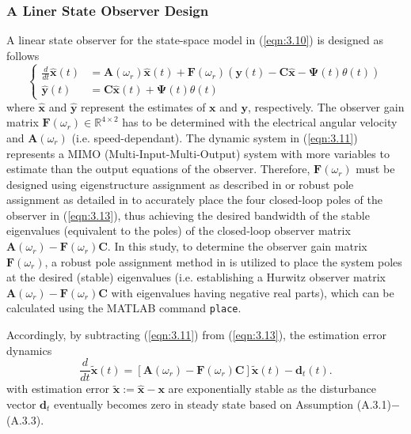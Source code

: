 \subsubsection{A Liner State Observer Design}
A linear state observer for the state-space model in (\ref{eqn:3.10}) is designed as follows
\begin{equation}\label{eqn:3.13}
\left\{
\begin{aligned}
    \frac{d}{dt} \hat{\mathbf{x}}(t) &= \mathbf{A}(\omega_r) \hat{\mathbf{x}}(t) + \mathbf{F}(\omega_r) \left( \mathbf{y}(t) - \mathbf{C} \hat{\mathbf{x}} - \mathbf{\Psi}(t) \theta(t) \right) \\
    \hat{\mathbf{y}}(t) &= \mathbf{C} \hat{\mathbf{x}}(t) + \mathbf{\Psi}(t) \theta(t)
\end{aligned}
\right.
\end{equation}
where \(\mathbf{\hat{x}}\) and \(\mathbf{\hat{y}}\) represent the estimates of \(\mathbf{x}\) and \(\mathbf{y}\), respectively. The observer gain matrix \(\mathbf{F}(\omega_r) \in \mathbb{R}^{4 \times 2}\) has to be determined with the electrical angular velocity and $\mathbf{A}(\omega_r)$ (i.e. speed-dependant). The dynamic system in (\ref{eqn:3.11}) represents a MIMO (Multi-Input-Multi-Output) system with more variables to estimate than the output equations of the observer. Therefore, \(\mathbf{F}(\omega_r)\) must be designed using eigenstructure assignment as described in \cite{c3.2_2} or robust pole assignment as detailed in \cite{c3.2_3} to accurately place the four closed-loop poles of the observer in (\ref{eqn:3.13}), thus achieving the desired bandwidth of the stable eigenvalues (equivalent to the poles) of the closed-loop observer matrix \(\mathbf{A}(\omega_r) - \mathbf{F}(\omega_r)\mathbf{C}\). In this study, to determine the observer gain matrix \( \mathbf{F}(\omega_r) \), a robust pole assignment method in \cite{c3.2_3} is utilized to place the system poles at the desired (stable) eigenvalues (i.e. establishing a Hurwitz observer matrix \(\mathbf{A}(\omega_r) - \mathbf{F}(\omega_r)\mathbf{C}\) with eigenvalues having negative real parts), which can be calculated using the MATLAB command \texttt{place}. 

Accordingly, by subtracting (\ref{eqn:3.11}) from (\ref{eqn:3.13}), the estimation error dynamics
\begin{equation}\label{eqn:3.14}
\frac{d}{dt} {\mathbf{\tilde{x}}}(t) = \left[ \mathbf{A}(\omega_r) - \mathbf{F}(\omega_r)\mathbf{C} \right] {\mathbf{\tilde{x}}}(t)- {\mathbf{d}_{t}}(t).
\end{equation}
with estimation error $\mathbf{\tilde{x}}:= \mathbf{\hat x}-\mathbf{ x}$ are exponentially stable as the disturbance vector \( \mathbf{d}_{t} \) eventually becomes zero in steady state based on Assumption (A.3.1)$-$(A.3.3).

